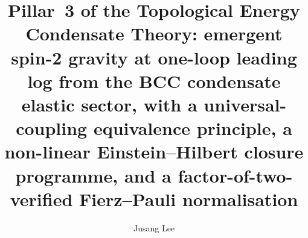 



\title{Pillar~3 of the Topological Energy Condensate Theory:
emergent spin-2 gravity at one-loop leading log from the BCC
condensate elastic sector, with a universal-coupling equivalence
principle, a non-linear Einstein--Hilbert closure programme, and a
factor-of-two-verified Fierz--Pauli normalisation}

\author{Jusang Lee}

